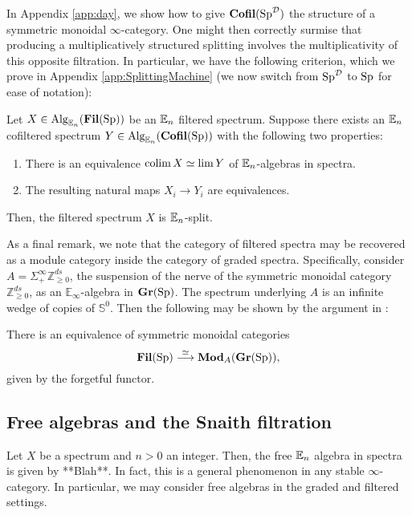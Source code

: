 In Appendix \ref{app:day}, we show how to give $\operatorname{\textbf{Cofil}}(\operatorname{\text{Sp}}^{\operatorname{\mathcal{D}}})$ the structure of a symmetric monoidal $\infty$-category.  One might then correctly surmise that producing a multiplicatively structured splitting involves the multiplicativity of this opposite filtration.  In particular, we have the following criterion, which we prove in Appendix \ref{app:SplittingMachine} (we now switch from $\operatorname{\text{Sp}}^{\operatorname{\mathcal{D}}}$ to $\operatorname{\text{Sp}}$ for ease of notation):

\begin{thm}\label{thm:SplitMachine}%
Let $X\in \operatorname{\text{Alg}}_{\operatorname{\mathbb{E}}_n}(\operatorname{\textbf{Fil}}(\operatorname{\text{Sp}}))$ be an $\operatorname{\mathbb{E}}_n$ filtered spectrum.  Suppose there exists an $\operatorname{\mathbb{E}}_n$ cofiltered spectrum $Y\in \operatorname{\text{Alg}}_{\operatorname{\mathbb{E}}_n}(\operatorname{\textbf{Cofil}}(\operatorname{\text{Sp}}))$ with the following two properties:
\begin{enumerate}
\item There is an equivalence $\operatorname*{\text{colim}} X \simeq \lim Y$ of $\operatorname{\mathbb{E}}_n$-algebras in spectra.
\item The resulting natural maps $X_i \to Y_i$ are equivalences.  
\end{enumerate}
Then, the filtered spectrum $X$ is $\operatorname{\mathbb{E}}_n$-split.
\end{thm}


As a final remark, we note that the category of filtered spectra may be recovered as a module category inside the category of graded spectra.  Specifically, consider $A=\Sigma^{\infty}_+ \mathbb{Z}^{ds}_{\ge 0}$, the suspension of the nerve of the symmetric monoidal category $\mathbb{Z}^{ds}_{\ge 0}$, as an $\mathbb{E}_\infty$-algebra in $\operatorname{\textbf{Gr}}(\operatorname{\text{Sp}})$.  The spectrum underlying $A$ is an infinite wedge of copies of $\mathbb{S}^0$.  Then the following may be shown by the argument in \cite[Proposition 3.1.6]{LurieRot}:

\begin{lem} \label{lem:FilAsGrMod}
There is an equivalence of symmetric monoidal categories
$$\operatorname{\textbf{Fil}}(\operatorname{\text{Sp}}) \stackrel{\simeq}{\longrightarrow} \textbf{Mod}_{A}(\operatorname{\textbf{Gr}}(\operatorname{\text{Sp}})),$$
given by the forgetful functor.
\end{lem}


\subsection{Free algebras and the Snaith filtration}
Let $X$ be a spectrum and $n>0$ an integer.  Then, the free $\operatorname{\mathbb{E}}_n$ algebra in spectra is given by **Blah**.  In fact, this is a general phenomenon in any stable $\infty$-category.   In particular, we may consider free algebras in the graded and filtered settings.  

